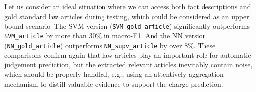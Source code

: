 Let us consider an ideal situation where we can access both fact descriptions and gold standard law articles during testing, which could be considered as an upper bound scenario.
The SVM version (\texttt{SVM\_gold\_article}) significantly outperforms %
\texttt{SVM\_article} by more than 30\% in macro-F1.
And the NN version %
(\texttt{NN\_gold\_article}) outperforms 
\texttt{NN\_supv\_article}
by over 8\%.
%
These comparisons confirm again that 
law articles play an important role for automatic judgement prediction, but 
the extracted relevant articles inevitably contain noise, which should be properly 
handled, e.g., using an attentively aggregation mechanism to distill 
valuable evidence to support the charge prediction.






